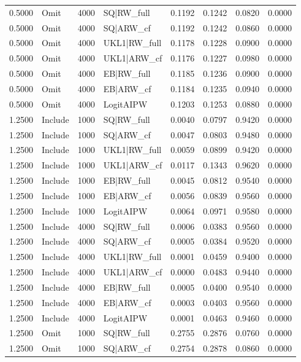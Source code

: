 \begin{tabular}{rlrlrrrr}
0.5000 & Omit & 4000 & SQ|RW\_full & 0.1192 & 0.1242 & 0.0820 & 0.0000 \\
0.5000 & Omit & 4000 & SQ|ARW\_cf & 0.1192 & 0.1242 & 0.0860 & 0.0000 \\
0.5000 & Omit & 4000 & UKL1|RW\_full & 0.1178 & 0.1228 & 0.0900 & 0.0000 \\
0.5000 & Omit & 4000 & UKL1|ARW\_cf & 0.1176 & 0.1227 & 0.0980 & 0.0000 \\
0.5000 & Omit & 4000 & EB|RW\_full & 0.1185 & 0.1236 & 0.0900 & 0.0000 \\
0.5000 & Omit & 4000 & EB|ARW\_cf & 0.1184 & 0.1235 & 0.0940 & 0.0000 \\
0.5000 & Omit & 4000 & LogitAIPW & 0.1203 & 0.1253 & 0.0880 & 0.0000 \\
1.2500 & Include & 1000 & SQ|RW\_full & 0.0040 & 0.0797 & 0.9420 & 0.0000 \\
1.2500 & Include & 1000 & SQ|ARW\_cf & 0.0047 & 0.0803 & 0.9480 & 0.0000 \\
1.2500 & Include & 1000 & UKL1|RW\_full & 0.0059 & 0.0899 & 0.9420 & 0.0000 \\
1.2500 & Include & 1000 & UKL1|ARW\_cf & 0.0117 & 0.1343 & 0.9620 & 0.0000 \\
1.2500 & Include & 1000 & EB|RW\_full & 0.0045 & 0.0812 & 0.9540 & 0.0000 \\
1.2500 & Include & 1000 & EB|ARW\_cf & 0.0056 & 0.0839 & 0.9560 & 0.0000 \\
1.2500 & Include & 1000 & LogitAIPW & 0.0064 & 0.0971 & 0.9580 & 0.0000 \\
1.2500 & Include & 4000 & SQ|RW\_full & 0.0006 & 0.0383 & 0.9560 & 0.0000 \\
1.2500 & Include & 4000 & SQ|ARW\_cf & 0.0005 & 0.0384 & 0.9520 & 0.0000 \\
1.2500 & Include & 4000 & UKL1|RW\_full & 0.0001 & 0.0459 & 0.9400 & 0.0000 \\
1.2500 & Include & 4000 & UKL1|ARW\_cf & 0.0000 & 0.0483 & 0.9440 & 0.0000 \\
1.2500 & Include & 4000 & EB|RW\_full & 0.0005 & 0.0400 & 0.9540 & 0.0000 \\
1.2500 & Include & 4000 & EB|ARW\_cf & 0.0003 & 0.0403 & 0.9560 & 0.0000 \\
1.2500 & Include & 4000 & LogitAIPW & 0.0001 & 0.0463 & 0.9460 & 0.0000 \\
1.2500 & Omit & 1000 & SQ|RW\_full & 0.2755 & 0.2876 & 0.0760 & 0.0000 \\
1.2500 & Omit & 1000 & SQ|ARW\_cf & 0.2754 & 0.2878 & 0.0860 & 0.0000 \\

\end{tabular}
